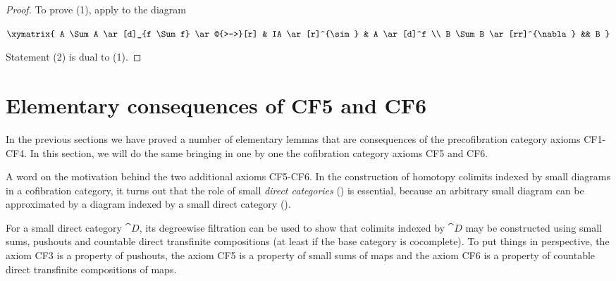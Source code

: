 \begin{proof}
To prove (1), apply  to the diagram 
\begin{center}
$\xymatrix {
    A \Sum A \ar[d]_{f \Sum f} \ar@{>->}[r] &
    IA  \ar[r]^{\sim} &
    A \ar[d]^f \\
    B \Sum B \ar[rr]^{\nabla} && B
  }$
\end{center}
Statement (2) is dual to (1).
\end{proof}


\section{Elementary consequences of CF5 and CF6}
\label{sec:transfincomp}
In the previous sections we have proved a number of elementary lemmas that are consequences of the precofibration category axioms CF1-CF4. In this section, we will do the same bringing in one by one the cofibration category axioms CF5 and CF6.

A word on the motivation behind the two additional axioms CF5-CF6. In the construction of homotopy colimits indexed by small diagrams in a cofibration category, it turns out that the role of small {\it direct categories} () is essential, because an arbitrary small diagram can be approximated by a diagram indexed by a small direct category (). 

For a small direct category ${\cat D}$, its degreewise filtration can be used to show that colimits indexed by ${\cat D}$ may be constructed using small sums, pushouts and countable direct transfinite compositions (at least if the base category is cocomplete). To put things in perspective, the axiom CF3 is a property of pushouts, the axiom CF5 is a property of small sums of maps and the axiom CF6 is a property of countable direct transfinite compositions of maps.

